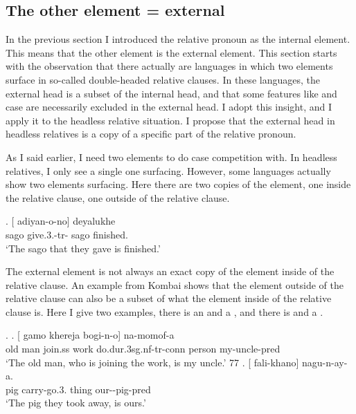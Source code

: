 \subsection{The other element = external}\label{sec:external-element}

 In the previous section I introduced the relative pronoun as the internal element. This means that the other element is the external element. This section starts with the observation that there actually are languages in which two elements surface in so-called double-headed relative clauses. In these languages, the external head is a subset of the internal head, and that some features like  and case are necessarily excluded in the external head. I adopt this insight, and I apply it to the headless relative situation. I propose that the external head in headless relatives is a copy of a specific part of the relative pronoun.%

 As I said earlier, I need two elements to do case competition with. In headless relatives, I only see a single one surfacing. However, some languages actually show two elements surfacing. Here there are two copies of the element, one inside the relative clause, one outside of the relative clause.

 \exg. [ adiyan-o-no]  deyalukhe\\
  sago give.3.-{tr}- sago finished.\\
  `The sago that they gave is finished.' 

 The external element is not always an exact copy of the element inside of the relative clause. An example from Kombai shows that the element outside of the relative clause can also be a subset of what the element inside of the relative clause is. Here I give two examples, there is an  and a , and there is  and a .

 \ex.
 \ag. [ gamo khereja bogi-n-o]  na-momof-a\\
  {old man} join.\ac{ss} work do.\ac{dur}.3\ac{sg}.\ac{nf}-\ac{tr}-\ac{conn} person my-uncle-\ac{pred}\\
  `The old man, who is joining the work, is my uncle.' 77
 \bg. [ fali-khano]  nagu-n-ay-a.\\
  pig carry-go.3. thing our--pig-\ac{pred}\\
  `The pig they took away, is ours.' 

